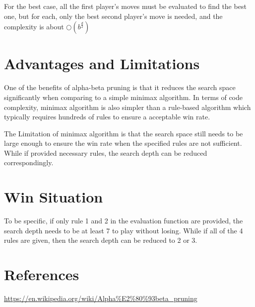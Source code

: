 \documentclass[a4paper]{scrartcl}
\begin{document}
For the best case, all the first player's moves must be evaluated to find the
best one, but for each, only the best second player's move is needed, and the
complexity is about \(\bigcirc(b^{\frac{d}{2}})\)

\section{Advantages and Limitations}
\label{sec:orge01830b}
One of the benefits of alpha-beta pruning is that it reduces the search space
significantly when comparing to a simple minimax algorithm. In terms of code
complexity, minimax algorithm is also simpler than a rule-based algorithm which
typically requires hundreds of rules to ensure a acceptable win rate.

The Limitation of minimax algorithm is that the search space still needs to be
large enough to ensure the win rate when the specified rules are not
sufficient. While if provided necessary rules, the search depth can be reduced
correspondingly.

\section{Win Situation}
\label{sec:org3e0e933}
To be specific, if only rule 1 and 2 in the evaluation function are provided,
the search depth needs to be at least 7 to play without losing. While if all
of the 4 rules are given, then the search depth can be reduced to 2 or 3.

\section{References}
\label{sec:org7550bba}
\url{https://en.wikipedia.org/wiki/Alpha\%E2\%80\%93beta\_pruning}
\end{document}
